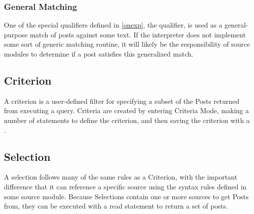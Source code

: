 \subsubsection{General Matching}%
One of the special qualifiers defined in \ref{onexp}, the  qualifier, is used as a general-purpose
match of posts against some text. If the interpreter does not implement some sort of generic matching
routine, it will likely be the responsibility of source modules to determine if a post satisfies this
generalized match.

\subsection{Criterion}
A criterion is a user-defined filter for specifying a subset of the Posts returned from executing a query.
Criteria are created by entering Criteria Mode, making a number of statements to define the criterion, and
then saving the criterion with a .

\subsection{Selection}
A selection follows many of the same rules as a Criterion, with the important difference that it can
reference a specific source using the syntax rules defined in some source module. Because Selections
contain one or more sources to get Posts from, they can be executed with a read statement to return a
set of posts.
